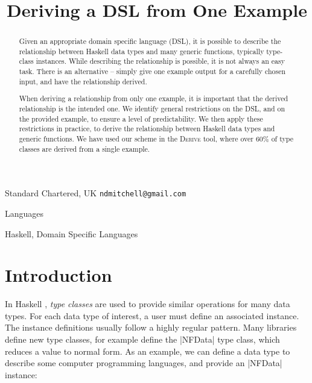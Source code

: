 \documentclass[preprint,draft]{sigplanconf}
\newcommand{\derive}{\textsc{Derive}}
\begin{document}
\copyrightdata{[to be supplied]}

\titlebanner{\today{} - \currenttime{}}        %
\preprintfooter{}   %

\title{Deriving a DSL from One Example}

           {Standard Chartered, UK}
           {\verb"ndmitchell@gmail.com"}

\maketitle


\begin{abstract}
Given an appropriate domain specific language (DSL), it is possible to describe the relationship between Haskell data types and many generic functions, typically type-class instances. While describing the relationship is possible, it is not always an easy task. There is an alternative -- simply give one example output for a carefully chosen input, and have the relationship derived.

When deriving a relationship from only one example, it is important that the derived relationship is the intended one. We identify general restrictions on the DSL, and on the provided example, to ensure a level of predictability. We then apply these restrictions in practice, to derive the relationship between Haskell data types and generic functions. We have used our scheme in the \derive{} tool, where over 60\% of type classes are derived from a single example.
\end{abstract}


\terms
Languages

\keywords
Haskell, Domain Specific Languages

\section{Introduction}
\label{sec:introduction}

In Haskell \cite{haskell}, \textit{type classes} \cite{wadler:type_classes} are used to provide similar operations for many data types. For each data type of interest, a user must define an associated instance. The instance definitions usually follow a highly regular pattern. Many libraries define new type classes, for example \citet{trinder:strategies} define the |NFData| type class, which reduces a value to normal form. As an example, we can define a data type to describe some computer programming languages, and provide an |NFData| instance:
\end{document}
